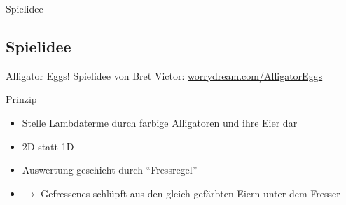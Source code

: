 \documentclass[18pt]{beamer}
\begin{document}
	\begin{frame}{Spielidee}
	\end{frame}

	\subsection{Spielidee}
	\begin{frame}[<+->]{Alligator Eggs!}
		Spielidee von Bret Victor: \textcolor{blue}{\href{/http://worrydream.com/AlligatorEggs}{worrydream.com/AlligatorEggs}}
		\begin{block}{Prinzip}
			\begin{itemize}
				\item Stelle Lambdaterme durch farbige Alligatoren und ihre Eier dar
				\item 2D statt 1D
				\item Auswertung geschieht durch "`Fressregel"'
				\item $\rightarrow$ Gefressenes schlüpft aus den gleich gefärbten Eiern unter dem Fresser
			\end{itemize}
		\end{block}
	\end{frame}
\end{document}
